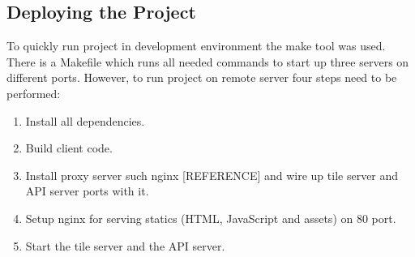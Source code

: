 \subsection{Deploying the Project}

To quickly run project in development environment the make tool was used. There is a Makefile
which runs all needed commands to start up three servers on different ports. However,
to run project on remote server four steps need to be performed:

\begin{enumerate}
  \item Install all dependencies.
  \item Build client code.
  \item Install proxy server such nginx [REFERENCE] and wire up tile server and API server ports with it.
  \item Setup nginx for serving statics (HTML, JavaScript and assets) on 80 port.
  \item Start the tile server and the API server.
\end{enumerate}
